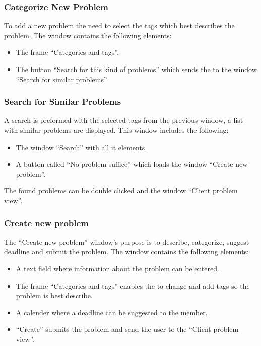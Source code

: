 \subsubsection{Categorize New Problem}
To add a new problem the \aclient[] need to select the tags which best describes the problem. The window contains the following elements:
\begin{itemize}
	\item The frame ``Categories and tags''.
	\item The button ``Search for this kind of problems'' which sends the \aclient[] to the window ``Search for similar problems''
\end{itemize}

\subsubsection{Search for Similar Problems}
A search is preformed with the selected tags from the previous window, a list with similar problems are displayed. This window includes the following: 
\begin{itemize}
	\item The window ``Search'' with all it elements.
	\item A button called ``No problem suffice'' which loads the window ``Create new problem''.
\end{itemize}
The found problems can be double clicked and the window ``Client problem view''. 

\subsubsection{Create new problem}
The ``Create new problem'' window's purpose is to describe, categorize, suggest deadline and submit the problem. The window contains the following elements:
\begin{itemize}
	\item A text field where information about the problem can be entered.
	\item The frame ``Categories and tags'' enables the \aclient to change and add tags so the problem is best describe.
	\item A calender where a deadline can be suggested to the \astaff member.
	\item ``Create'' submits the problem and send the user to the ``Client problem view''.
\end{itemize}







